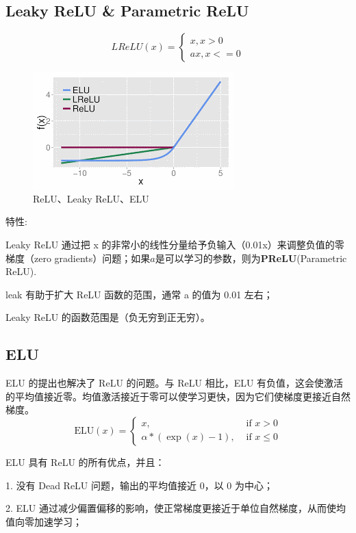 \documentclass{article}
\begin{document}
\subsection{Leaky ReLU \& Parametric ReLU}
\begin{equation}
LReLU(x) = \begin{cases}
	x, x>0 \\
	ax, x<=0
	\end{cases}
\end{equation}
\begin{figure}[htp]
\centering
\includegraphics[scale=1]{images/activation/elu.png}
\caption{ReLU、Leaky ReLU、ELU}
\label{Fig.elu}
\end{figure}
特性:

Leaky ReLU 通过把 x 的非常小的线性分量给予负输入（0.01x）来调整负值的零梯度（zero gradients）问题；如果$a$是可以学习的参数，则为\textbf{PReLU}(Parametric ReLU).

leak 有助于扩大 ReLU 函数的范围，通常 a 的值为 0.01 左右；

Leaky ReLU 的函数范围是（负无穷到正无穷）。

\subsection{ELU}
ELU 的提出也解决了 ReLU 的问题。与 ReLU 相比，ELU 有负值，这会使激活的平均值接近零。均值激活接近于零可以使学习更快，因为它们使梯度更接近自然梯度。
\begin{equation}
        \text{ELU}(x) = \begin{cases}
        x, & \text{ if } x > 0\\
        \alpha * (\exp(x) - 1), & \text{ if } x \leq 0
        \end{cases}
\end{equation}

ELU 具有 ReLU 的所有优点，并且：

1. 没有 Dead ReLU 问题，输出的平均值接近 0，以 0 为中心；

2. ELU 通过减少偏置偏移的影响，使正常梯度更接近于单位自然梯度，从而使均值向零加速学习；
\end{document}
